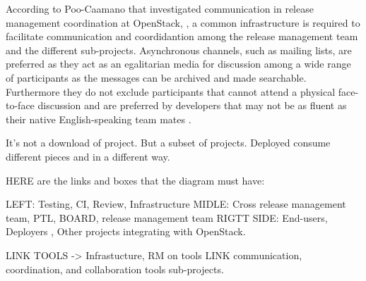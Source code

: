 \documentclass[dvipsnames]{interact}
\theoremstyle{plain}\newtheorem{theorem}{Theorem}[section]
\theoremstyle{definition}
\theoremstyle{remark}
\newenvironment{newStuff}{
    \begin{color}{Sepia}
    \begin{tabular}{|p{1.0\textwidth}|}
    \hline\\
    }
    { 
    \\\\\hline
    \end{tabular} 
    \end{color}
    }
\renewenvironment{newStuff}{}{}
\begin{document}
\begin{newStuff}
According to Poo-Caamano  \citep{PooCaamanoKnauss_et_al2017} that investigated communication in release management coordination at OpenStack, 
, a common infrastructure is required to facilitate communication and coordidantion among the  release management team and the different sub-projects. Asynchronous channels, such as mailing lists, are preferred as they act as an egalitarian media for discussion among a wide range of participants as the messages can be archived and made searchable. Furthermore they do not exclude participants that cannot attend a physical face-to-face discussion and are preferred by developers that may not be as fluent as their native English-speaking team mates \citep{PooCaamanoKnauss_et_al2017}. 






It's not a download of project. But a subset of projects. Deployed consume different pieces and in a different way. 




 
 
\end{newStuff}


\begin{newStuff}
 HERE are the links and boxes that the diagram must  have: 

  LEFT: Testing, CI, Review, Infrastructure 
   MIDLE: Cross release management team, PTL, BOARD, release management team 
 RIGTT SIDE: End-users, Deployers , Other projects integrating with OpenStack.  


  LINK TOOLS -> Infrastucture, RM on tools 
  LINK communication, coordination, and collaboration tools  sub-projects.
 
\end{newStuff}
\end{document}
